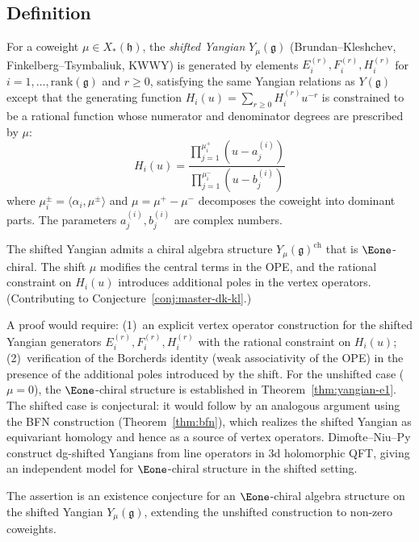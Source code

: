 \subsection{Definition}

\begin{definition}\label{def:shifted-yangian}
For a coweight $\mu \in X_*(\mathfrak{h})$, the \emph{shifted Yangian} $Y_\mu(\mathfrak{g})$
(Brundan--Kleshchev, Finkelberg--Tsymbaliuk, KWWY) is generated by elements
$E_i^{(r)}, F_i^{(r)}, H_i^{(r)}$ for $i = 1, \ldots, \mathrm{rank}(\mathfrak{g})$
and $r \geq 0$, satisfying the same Yangian relations as $Y(\mathfrak{g})$ except that the
generating function $H_i(u) = \sum_{r \geq 0} H_i^{(r)} u^{-r}$ is constrained to be a rational
function whose numerator and denominator degrees are prescribed by $\mu$:
\[
H_i(u) = \frac{\prod_{j=1}^{\mu_i^+}(u - a_j^{(i)})}{\prod_{j=1}^{\mu_i^-}(u - b_j^{(i)})}
\]
where $\mu_i^\pm = \langle \alpha_i, \mu^\pm \rangle$ and $\mu = \mu^+ - \mu^-$ decomposes the coweight into dominant parts. The parameters $a_j^{(i)}, b_j^{(i)}$ are complex numbers.
\end{definition}

\begin{conjecture}\label{conj:shifted-yangian-e1}
The shifted Yangian admits a chiral algebra structure $Y_\mu(\mathfrak{g})^{\mathrm{ch}}$
that is $\Eone$-chiral. The shift $\mu$ modifies the central terms in the OPE,
and the rational constraint on $H_i(u)$ introduces additional poles in the vertex
operators.
\ifannalsedition\else
(Contributing to Conjecture~\ref{conj:master-dk-kl}.)
\fi
\end{conjecture}

\begin{remark}[Scope]
A proof would require: (1)~an explicit vertex operator construction for
the shifted Yangian generators $E_i^{(r)}, F_i^{(r)}, H_i^{(r)}$ with
the rational constraint on $H_i(u)$; (2)~verification of the Borcherds
identity (weak associativity of the OPE) in the presence of the additional
poles introduced by the shift. For the unshifted case ($\mu = 0$), the
$\Eone$-chiral structure is established in Theorem~\ref{thm:yangian-e1}.
The shifted case is conjectural: it would follow by an analogous argument using the
BFN construction (Theorem~\ref{thm:bfn}), which realizes the shifted
Yangian as equivariant homology and hence as a source of
vertex operators. Dimofte--Niu--Py \cite{DNP25} construct dg-shifted Yangians
from line operators in 3d holomorphic QFT, giving an independent model for
$\Eone$-chiral structure in the shifted setting.

The assertion is an existence conjecture for an $\Eone$-chiral
algebra structure on the shifted Yangian $Y_\mu(\mathfrak{g})$,
extending the unshifted construction to non-zero coweights.
\end{remark}


